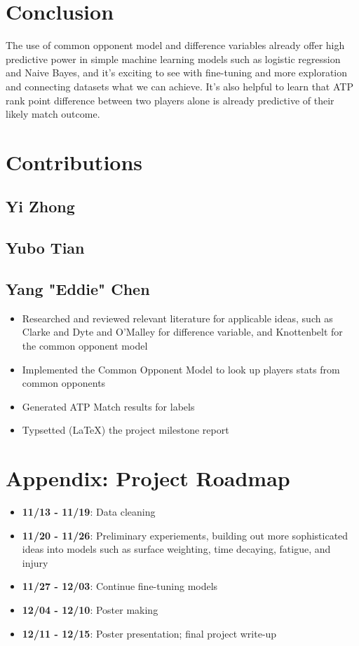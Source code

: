 \documentclass[paper=a4, fontsize=11pt]{scrartcl} %
\numberwithin{equation}{section} %
\numberwithin{figure}{section} %
\numberwithin{table}{section} %
\begin{document}
\section{Conclusion}
The use of common opponent model and difference variables already offer high predictive power in simple machine learning models such as logistic regression and Naive Bayes, and it's exciting to see with fine-tuning and more exploration and connecting datasets what we can achieve. It's also helpful to learn that ATP rank point difference between two players alone is already predictive of their likely match outcome. 

\appendix

\section{Contributions}
\subsection{Yi Zhong}
\subsection{Yubo Tian}
\subsection{Yang "Eddie" Chen}
\begin{itemize}
\item Researched and reviewed relevant literature for applicable ideas, such as Clarke and Dyte \cite{Clarke2010} and O'Malley \cite{omalley} for difference variable, and Knottenbelt \cite{KNOTTENBELT20123820} for the common opponent model
\item Implemented the Common Opponent Model to look up players stats from common opponents
\item Generated ATP Match results for labels
\item Typsetted (\LaTeX) the project milestone report
\end{itemize}

\section{Appendix: Project Roadmap}
\begin{itemize}
\item \textbf{11/13 - 11/19}: Data cleaning
\item \textbf{11/20 - 11/26}: Preliminary experiements, building out more sophisticated ideas into models such as surface weighting, time decaying, fatigue, and injury
\item \textbf{11/27 - 12/03}: Continue fine-tuning models
\item \textbf{12/04 - 12/10}: Poster making
\item \textbf{12/11 - 12/15}: Poster presentation; final project write-up
\end{itemize}


 
\end{document}
